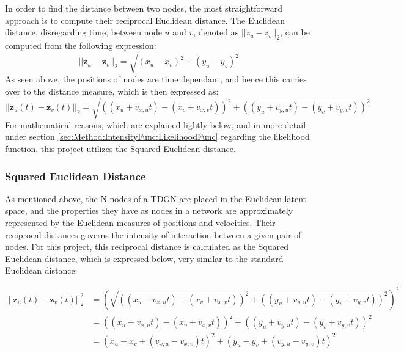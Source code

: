 In order to find the distance between two nodes, the most straightforward approach is to compute their reciprocal Euclidean distance.
The Euclidean distance, disregarding time, between node $u$ and $v$, denoted as $||z_u - z_v||_2$, can be computed from the following expression:
$$
||\textbf{z}_u - \textbf{z}_v||_2
= 
\sqrt{(x_u - x_v)^2 + (y_u - y_v)^2}
$$
As seen above, the positions of nodes are time dependant, and hence this carries over to the distance measure, which is then expressed as:
$$
||\textbf{z}_u(t) - \textbf{z}_v(t)||_2
= 
\sqrt{((x_u + v_{x,u}t) - (x_v + v_{x,v}t))^2 + ((y_u + v_{y,u}t) - (y_v + v_{y,v}t))^2}
$$
For mathematical reasons, which are explained lightly below, and in more detail under section \ref{sec:Method:IntensityFunc:LikelihoodFunc} regarding the likelihood function, this project utilizes the Squared Euclidean distance.

\subsubsection{Squared Euclidean Distance}
\label{sec:Method:LSM:SquaredEuclideanDistance}
As mentioned above, the N nodes of a TDGN are placed in the Euclidean latent space, and the properties they have as nodes in a network are approximately represented by the Euclidean measures of positions and velocities.
Their reciprocal distances governs the intensity of interaction between a given pair of nodes.
For this project, this reciprocal distance is calculated as the Squared Euclidean distance, which is expressed below, very similar to the standard Euclidean distance:

\begin{align*} 
||\textbf{z}_u(t) - \textbf{z}_v(t)||_2^2
&= 
\left(\sqrt{((x_u + v_{x,u}t) - (x_v + v_{x,v}t))^2 + ((y_u + v_{y,u}t) - (y_v + v_{y,v}t))^2}\right)^2
\\
&=
((x_u + v_{x,u}t) - (x_v + v_{x,v}t))^2 + ((y_u + v_{y,u}t) - (y_v + v_{y,v}t))^2
\\
&=
(x_u - x_v + (v_{x,u} - v_{x,v})t)^2 + (y_u - y_v + ( v_{y,u} - v_{y,v})t)^2
\end{align*}




